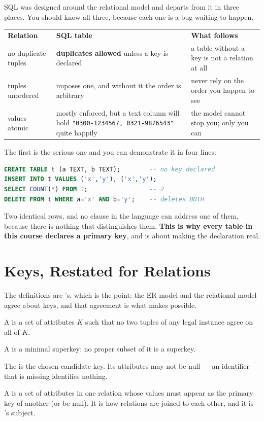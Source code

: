 \begin{alertbox}
SQL was designed around the relational model and departs from it in three
places. You should know all three, because each one is a bug waiting to
happen.

\medskip
\begin{tabular}{@{}L{4.0cm}L{4.6cm}L{5.1cm}@{}}
\textbf{Relation} & \textbf{SQL table} & \textbf{What follows} \\
no duplicate tuples & \textbf{duplicates allowed} unless a key is declared &
  a table without a key is not a relation at all \\
tuples unordered &  imposes one, and without it the order is
  arbitrary & never rely on the order you happen to see \\
values atomic & mostly enforced, but a text column will hold
  \texttt{"0300-1234567, 0321-9876543"} quite happily &
  the model cannot stop you; only you can \\
\end{tabular}

\smallskip
The first is the serious one and you can demonstrate it in four lines:

\begin{lstlisting}[language=sql]
CREATE TABLE t (a TEXT, b TEXT);        -- no key declared
INSERT INTO t VALUES ('x','y'), ('x','y');
SELECT COUNT(*) FROM t;                 -- 2
DELETE FROM t WHERE a='x' AND b='y';    -- deletes BOTH
\end{lstlisting}

Two identical rows, and no  clause in the language can address one
of them, because there is nothing that distinguishes them. \textbf{This is why
every table in this course declares a primary key}, and  is
about making the declaration real.
\end{alertbox}

\section{Keys, Restated for Relations}

The definitions are 's, which is the point: the ER model and the
relational model agree about keys, and that agreement is what makes
 possible.

\begin{definitionbox}
A  is a set of attributes $K$ such that no two tuples of any
legal instance agree on all of $K$.

\smallskip
A  is a minimal superkey: no proper subset of it is a
superkey.

\smallskip
The  is the chosen candidate key. Its attributes may not be
null --- an identifier that is missing identifies nothing.

\smallskip
A  is a set of attributes in one relation whose values must
appear as the primary key of another (or be null). It is how relations are
joined to each other, and it is 's subject.
\end{definitionbox}

